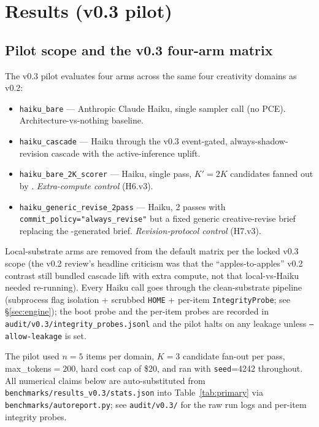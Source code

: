 \section{Results (v0.3 pilot)}\label{sec:results}

\subsection{Pilot scope and the v0.3 four-arm matrix}

The v0.3 pilot evaluates four arms across the same four creativity domains as v0.2:
\begin{itemize}
  \item \texttt{haiku\_bare}                  --- Anthropic Claude Haiku, single sampler call (no PCE). Architecture-vs-nothing baseline.
  \item \texttt{haiku\_cascade}               --- Haiku through the v0.3 event-gated, always-shadow-revision cascade with the active-inference uplift.
  \item \texttt{haiku\_bare\_2K\_scorer}      --- Haiku, single pass, $K' = 2K$ candidates fanned out by . \emph{Extra-compute control} (H6.v3).
  \item \texttt{haiku\_generic\_revise\_2pass} --- Haiku, 2 passes with \texttt{commit\_policy="always\_revise"} but a fixed generic creative-revise brief replacing the -generated brief. \emph{Revision-protocol control} (H7.v3).
\end{itemize}
Local-substrate arms are removed from the default matrix per the locked v0.3 scope (the v0.2 review's headline criticism was that the ``apples-to-apples'' v0.2 contrast still bundled cascade lift with extra compute, not that local-vs-Haiku needed re-running). Every Haiku call goes through the clean-substrate pipeline (subprocess flag isolation + scrubbed \texttt{HOME} + per-item \texttt{IntegrityProbe}; see \S\ref{sec:engine}); the boot probe and the per-item probes are recorded in \texttt{audit/v0.3/integrity\_probes.jsonl} and the pilot halts on any leakage unless \texttt{--allow-leakage} is set.

The pilot used $n{=}5$ items per domain, $K{=}3$ candidate fan-out per pass, max\_tokens$=200$, hard cost cap of \$20, and ran with \texttt{seed}=4242 throughout. All numerical claims below are auto-substituted from \texttt{benchmarks/results\_v0.3/stats.json} into Table~\ref{tab:primary} via \texttt{benchmarks/autoreport.py}; see \texttt{audit/v0.3/} for the raw run logs and per-item integrity probes.

